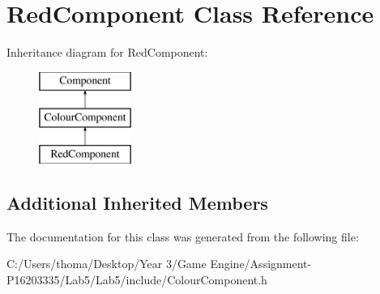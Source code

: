 \hypertarget{class_red_component}{}\section{Red\+Component Class Reference}
\label{class_red_component}
Inheritance diagram for Red\+Component\+:\begin{figure}[H]
\begin{center}
\leavevmode
\includegraphics[height=3.000000cm]{class_red_component}
\end{center}
\end{figure}
\subsection*{Additional Inherited Members}


The documentation for this class was generated from the following file\+:\begin{DoxyCompactItemize}
\item 
C\+:/\+Users/thoma/\+Desktop/\+Year 3/\+Game Engine/\+Assignment-\/\+P16203335/\+Lab5/\+Lab5/include/Colour\+Component.\+h\end{DoxyCompactItemize}
